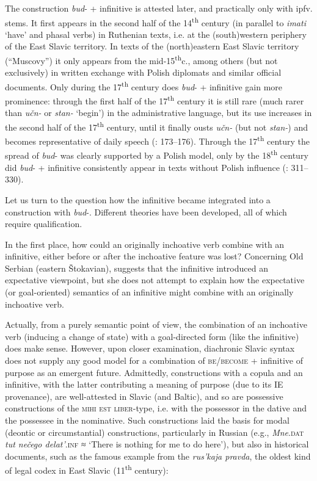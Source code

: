 \documentclass[output=paper,colorlinks,citecolor=brown]{langscibook}
\begin{document}
The construction \textit{bud}- + infinitive is attested later, and practically only with ipfv. stems. It first appears in the second half of the 14\textsuperscript{th} century (in parallel to \textit{imati} ‘have’ and phasal verbs) in Ruthenian texts, i.e. at the (south)western periphery of the East Slavic territory. In texts of the (north)eastern East Slavic territory (“Muscovy”) it only appears from the mid-15\textsuperscript{th}c., among others (but not exclusively) in written exchange with Polish diplomats and similar official documents. Only during the 17\textsuperscript{th} century does \textit{bud}- + infinitive gain more prominence: through the first half of the 17\textsuperscript{th} century it is still rare (much rarer than \textit{učn-} or \textit{stan-} ‘begin’) in the administrative language, but its use increases in the second half of the 17\textsuperscript{th} century, until it finally ousts \textit{učn-} (but not \textit{stan-}) and becomes representative of daily speech (\cite{Křížková1960}: 173--176). Through the 17\textsuperscript{th} century the spread of \textit{bud}- was clearly supported by a Polish model, only by the 18\textsuperscript{th} century did \textit{bud}- + infinitive consistently appear in texts without Polish influence (\cite{Moser1998}: 311--330). 



\label{sec:wiemer:3.2.1.3}

Let us turn to the question how the infinitive became integrated into a construction with \textit{bud}-. Different theories have been developed, all of which require qualification.

In the first place, how could an originally inchoative verb combine with an infinitive, either before or after the inchoative feature was lost? Concerning Old Serbian (eastern Štokavian), \citet[97]{Grković-Mejdžor2012} suggests that the infinitive introduced an expectative viewpoint, but she does not attempt to explain how the expectative (or goal-oriented) semantics of an infinitive might combine with an originally inchoative verb.

Actually, from a purely semantic point of view, the combination of an inchoative verb (inducing a change of state) with a goal-directed form (like the infinitive) does make sense. However, upon closer examination, diachronic Slavic syntax does not supply any good model for a combination of \textsc{be}/\textsc{become} + infinitive of purpose as an emergent future. Admittedly, constructions with a copula and an infinitive, with the latter contributing a meaning of purpose (due to its IE provenance), are well-attested in Slavic (and Baltic), and so are possessive constructions of the \textsc{mihi est liber}-type, i.e. with the possessor in the dative and the possessee in the nominative. Such constructions laid the basis for modal (deontic or circumstantial) constructions, particularly in Russian (e.g., \textit{Mne}.\textsc{dat} \textit{tut nečego delat’}.\textsc{inf} ≈ ‘There is nothing for me to do here’), but also in historical documents, such as the famous example  from the \textit{rus’kaja pravda}, the oldest kind of legal codex in East Slavic (11\textsuperscript{th} century):
\end{document}
